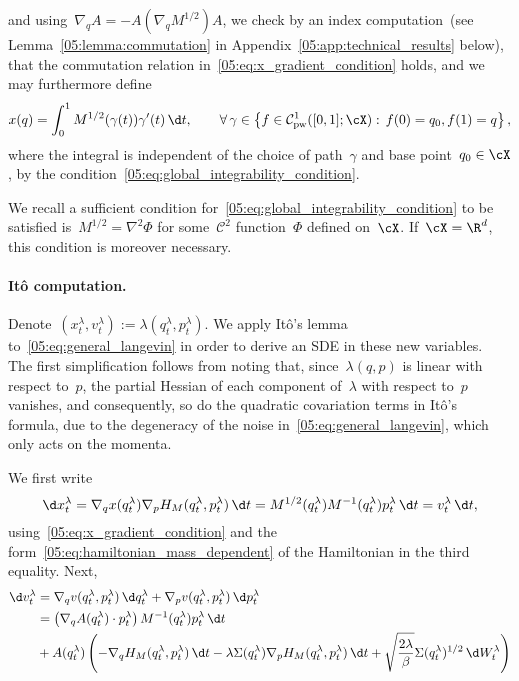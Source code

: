 and using~$\nabla_q A = - A (\nabla_q M^{1/2}) A$, we check by an index computation~(see Lemma~\ref{05:lemma:commutation} in Appendix~\ref{05:app:technical_results} below), that the commutation relation in~\eqref{05:eq:x_gradient_condition} holds, and we may furthermore define
\begin{equation}
    \label{05:eq:x_definition}
    x(q) = \int_{0}^1 M^{1/2}(\gamma(t))\gamma'(t)\,\d t,\qquad\forall\,\gamma\in\left\{f\in\mathcal C_{\mathrm{pw}}^1([0,1];\cX):\, f(0)=q_0,f(1)=q\right\},
\end{equation}
where the integral is independent of the choice of path~$\gamma$ and base point~$q_0\in\cX$, by the condition~\eqref{05:eq:global_integrability_condition}.

We recall a sufficient condition for~\eqref{05:eq:global_integrability_condition} to be satisfied is~$M^{1/2}=\nabla^2 \Phi$ for some~$\mathcal C^2$ function~$\Phi$ defined on~$\cX$. If~$\cX=\R^d$, this condition is moreover necessary.
\paragraph{It\^o computation.}
Denote~$(x_t^\lambda,v_t^\lambda) := \lambda(q_t^\lambda,p_t^\lambda)$. We apply It\^o's lemma to~\eqref{05:eq:general_langevin} in order to derive an SDE in these new variables.~
The first simplification follows from noting that, since~$\lambda(q,p)$ is linear with respect to~$p$, the partial Hessian of each component of~$\lambda$ with respect to~$p$ vanishes, and consequently, so do the quadratic covariation terms in It\^o's formula, due to the degeneracy of the noise in~\eqref{05:eq:general_langevin}, which only acts on the momenta.

We first write
\begin{equation}
    \d x_t^\lambda = \nabla_q x(q_t^\lambda)\nabla_p H_M(q_t^\lambda,p_t^\lambda)\,\d t = M^{1/2}(q_t^\lambda)M^{-1}(q_t^\lambda)p_t^\lambda\,\d t = v_t^\lambda\,\d t,
\end{equation}
using~\eqref{05:eq:x_gradient_condition} and the form~\eqref{05:eq:hamiltonian_mass_dependent} of the Hamiltonian in the third equality. Next,
\begin{equation}
    \begin{aligned}
    \d v_t^\lambda &= \nabla_q v(q_t^\lambda,p_t^\lambda)\,\d q_t^\lambda + \nabla_p v(q_t^\lambda,p_t^\lambda)\,\d p_t^\lambda\\
    &= \left(\nabla_q A(q_t^\lambda)\cdot p_t^\lambda\right)M^{-1}(q_t^\lambda)p_t^\lambda\,\d t\\
    &+ A(q_t^\lambda)\left(-\nabla_q H_M(q_t^\lambda,p_t^\lambda)\,\d t -\lambda\Sigma(q_t^\lambda)\nabla_p H_M(q_t^\lambda,p_t^\lambda)\,\d t + \sqrt{\frac{2\lambda}{\beta}}\Sigma(q_t^\lambda)^{1/2}\,\d W_t^\lambda\right)\\
    \end{aligned}
\end{equation}

